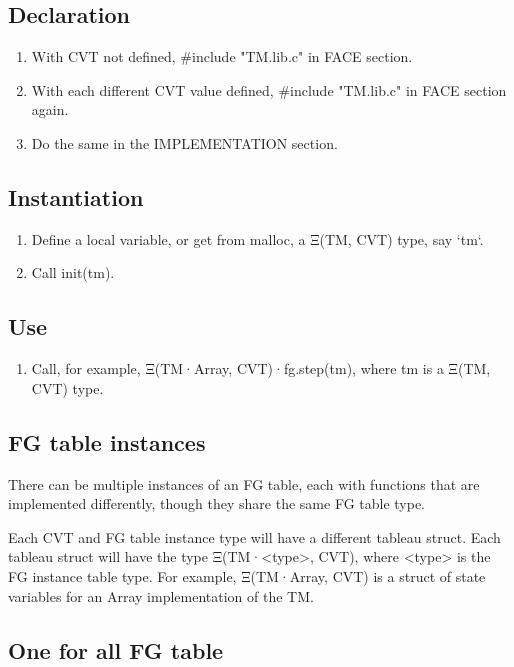 \documentclass[11pt]{article}
\begin{document}
\subsection{Declaration}
\label{sec:org2d5c70b}

\begin{enumerate}
\item With CVT not defined, \#include "TM.lib.c" in FACE section.
\item With each different CVT value defined, \#include "TM.lib.c" in FACE section again.
\item Do the same in the IMPLEMENTATION section.
\end{enumerate}

\subsection{Instantiation}
\label{sec:orgf6668e0}

\begin{enumerate}
\item Define a local variable, or get from malloc, a Ξ(TM, CVT) type, say `tm`.
\item Call init(tm).
\end{enumerate}

\subsection{Use}
\label{sec:orgcb2825f}

\begin{enumerate}
\item Call, for example, Ξ(TM·Array, CVT)·fg.step(tm), where tm is a Ξ(TM, CVT) type.
\end{enumerate}

\subsection{FG table instances}
\label{sec:org4267ad9}

There can be multiple instances of an FG table, each with functions that are implemented differently, though they share the same FG table type.

Each CVT and FG table instance type will have a different tableau struct. Each tableau struct will have the type Ξ(TM·<type>, CVT), where <type> is the FG instance table type. For example, Ξ(TM·Array, CVT) is a struct of state variables for an Array implementation of the TM.

\subsection{One for all FG table}
\label{sec:orga349d27}
\end{document}
